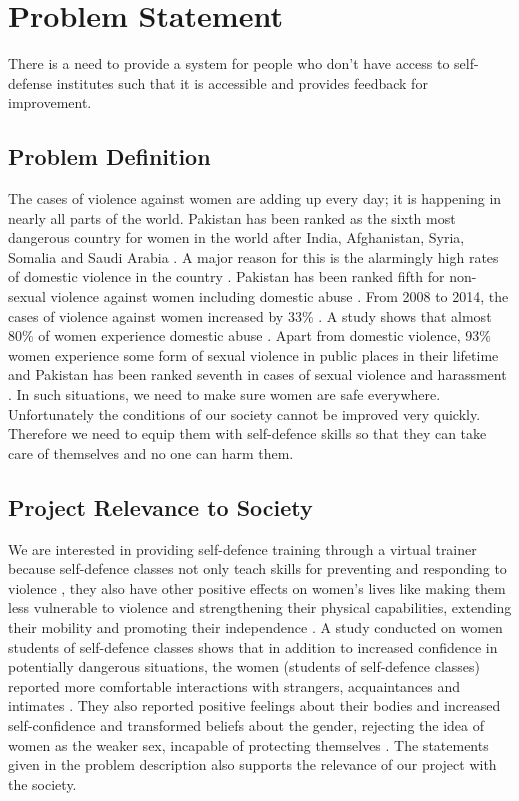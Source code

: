 \section{Problem Statement}

There is a need to provide a system for people who don’t have access to self-defense institutes such that it is accessible and provides feedback for improvement.

\subsection{Problem Definition}

The cases of violence against women are adding up every day; it is happening in nearly all parts of the world. Pakistan has been ranked as the sixth most dangerous country for women in the world after India, Afghanistan, Syria, Somalia and Saudi Arabia \cite{poll2018}. A major reason for this is the alarmingly high rates of domestic violence in the country \cite{domesticViolence}. Pakistan has been ranked fifth for non-sexual violence against women including domestic abuse \cite{poll2018}. From 2008 to 2014, the cases of violence against women increased by 33\% \cite{domesticViolence}. A study shows that almost 80\% of women experience domestic abuse \cite{genderBasedViolence}.  Apart from domestic violence, 93\% women experience some form of sexual violence in public places in their lifetime \cite{sexualViolence} and Pakistan has been ranked seventh in cases of sexual violence and harassment \cite{poll2018}. In such situations, we need to make sure women are safe everywhere. Unfortunately the conditions of our society cannot be improved very quickly. Therefore we need to equip them with self-defence skills so that they can take care of themselves and no one can harm them.


\subsection{Project Relevance to Society}

We are interested in providing self-defence training through a virtual trainer because self-defence classes not only teach skills for preventing and responding to violence \cite{hollander}, they also have other positive effects on women’s lives like making them less vulnerable to violence and strengthening their physical capabilities, extending their mobility and promoting their independence \cite{selfDefenseMovement}. A study conducted on women students of self-defence classes shows that in addition to increased confidence in potentially dangerous situations, the women (students of self-defence classes) reported more comfortable interactions with strangers, acquaintances and intimates \cite{hollander}. They also reported positive feelings about their bodies and increased self-confidence and transformed beliefs about the gender, rejecting the idea of women as the weaker sex, incapable of protecting themselves \cite{hollander}. The statements given in the problem description also supports the relevance of our project with the society.

